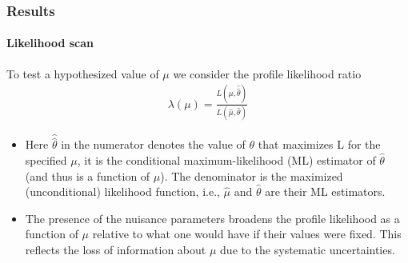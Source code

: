 \documentclass[11pt]{beamer}
\begin{document}
\begin{frame}
\frametitle{Results}
\framesubtitle{Likelihood scan}
To test a hypothesized value of $\mu$ we consider the profile likelihood ratio
\begin{align}
\lambda(\mu)=\frac{L(\mu,\hat{\hat{\theta}})}{L(\hat{\mu},\hat{\theta})}
\end{align}
\small{
\begin{itemize}
\item Here $\hat{\hat{\theta}} $ in the numerator denotes the value of $\theta$ that maximizes L for the specified $\mu$,
it is the conditional maximum-likelihood (ML) estimator of $\hat{\theta}$ (and thus is a function of $\mu$).
The denominator is the maximized (unconditional) likelihood function, i.e., $\hat{\mu}$ and $\hat{\theta}$ are
their ML estimators\cite{3}. 
\item The presence of the nuisance parameters broadens the profile likelihood as a
function of $\mu$ relative to what one would have if their values were fixed. This reflects the loss
of information about $\mu$ due to the systematic uncertainties\cite{3}\cite{4}. 
\end{itemize}
}
\end{frame}
\end{document}

